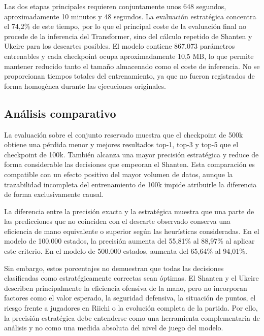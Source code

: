 Las dos etapas principales requieren conjuntamente unos 648 segundos, aproximadamente 10 minutos y 48 segundos. La evaluación estratégica concentra el 74,2\% de este tiempo, por lo que el principal coste de la evaluación final no procede de la inferencia del Transformer, sino del cálculo repetido de Shanten y Ukeire para los descartes posibles. El modelo contiene 867.073 parámetros entrenables y cada checkpoint ocupa aproximadamente 10,5 MB, lo que permite mantener reducido tanto el tamaño almacenado como el coste de inferencia. No se proporcionan tiempos totales del entrenamiento, ya que no fueron registrados de forma homogénea durante las ejecuciones originales.

\subsection{Análisis comparativo}

La evaluación sobre el conjunto reservado muestra que el checkpoint de 500k obtiene una pérdida menor y mejores resultados top-1, top-3 y top-5 que el checkpoint de 100k. También alcanza una mayor precisión estratégica y reduce de forma considerable las decisiones que empeoran el Shanten. Esta comparación es compatible con un efecto positivo del mayor volumen de datos, aunque la trazabilidad incompleta del entrenamiento de 100k impide atribuirle la diferencia de forma exclusivamente causal.

La diferencia entre la precisión exacta y la estratégica muestra que una parte de las predicciones que no coinciden con el descarte observado conserva una eficiencia de mano equivalente o superior según las heurísticas consideradas. En el modelo de 100.000 estados, la precisión aumenta del 55,81\% al 88,97\% al aplicar este criterio. En el modelo de 500.000 estados, aumenta del 65,64\% al 94,01\%.

Sin embargo, estos porcentajes no demuestran que todas las decisiones clasificadas como estratégicamente correctas sean óptimas. El Shanten y el Ukeire describen principalmente la eficiencia ofensiva de la mano, pero no incorporan factores como el valor esperado, la seguridad defensiva, la situación de puntos, el riesgo frente a jugadores en Riichi o la evolución completa de la partida. Por ello, la precisión estratégica debe entenderse como una herramienta complementaria de análisis y no como una medida absoluta del nivel de juego del modelo.

